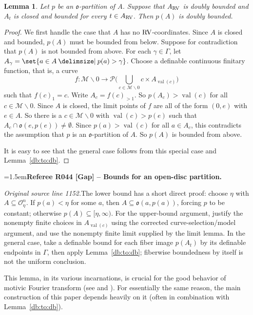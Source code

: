 \documentclass[12pt]{amsart}
\newcommand{\RefereeRemark}[4]{%
  \par\medskip\begingroup\normalfont\small\color{RefereePurple}%
  \emergencystretch=1.5em\noindent\textbf{Referee R#1 [#2] -- #3.}\par\nobreak\noindent #4\par
  \endgroup\medskip
}
\theoremstyle{plain}
\newtheorem{lem}[thm]{Lemma}
\theoremstyle{definition}
\theoremstyle{remark}
\numberwithin{equation}{section}
\theoremstyle{plain}
\newcommand{\RV}{\textup{RV}}
\newcommand{\MM}{\mdl M}
\newcommand{\OO}{\mdl O}
\newcommand{\go}{\mathfrak{o}}
\newcommand{\0}{\emptyset}
\newcommand{\mdl}[1]{\mathcal{#1}}  %
\newcommand{\fun}{\longrightarrow}
\newcommand{\mi}{\smallsetminus}
\providecommand\given{}
\newcommand\SetSymbol[1][]{%
\nonscript \: #1 \vert
\allowbreak
\nonscript\:
\mathopen{}}
\renewcommand\given{\SetSymbol[\delimsize]}
\DeclareMathOperator{\vv}{val}
\begin{document}
\begin{lem}\label{vol:par:bounded}
Let $p$ be an $\go$-partition of $A$. Suppose that $A_{\RV}$ is doubly bounded and $A_t$ is closed and bounded for every $t \in A_{\RV}$. Then $p(A)$ is doubly bounded.
\end{lem}
\begin{proof}
We first handle the case that $A$ has no $\RV$-coordinates. Since $A$ is closed and bounded, $p(A)$ must be bounded from below. Suppose for contradiction that $p(A)$ is not bounded from above. For each $\gamma \in \Gamma$, let $A_{\gamma} = \set{a \in A \given p(a) > \gamma }$. Choose a definable continuous finitary function, that is, a curve
\[
f : \MM \mi 0 \fun \mdl P \bigg( \bigcup_{c \in \MM \mi 0} c \times A_{\vv(c)} \bigg)
\]
such that $f(c)_1 = c$. Write $A_c = f(c)_{>1}$. So $p(A_c) > \vv(c)$ for all $c \in \MM \mi 0$. Since  $A$ is closed, the limit points of $f$ are all of the form $(0,e)$ with $e \in A$. So there is a $c \in \MM \mi 0$ with $\vv(c) > p( e)$ such that $A_c \cap \go(e, p( e)) \neq \0$. Since $p(a) > \vv(c)$ for all $a \in A_c$, this contradicts the assumption that $p$ is an $\go$-partition of $A$. So $p(A)$ is bounded from above.

It is easy to see that the general case follows from this special case and Lemma~\ref{db:to:db}.
\end{proof}

\RefereeRemark{044}{Gap}{Bounds for an open-disc partition}{%
\textit{Original source line 1152.}\quad The lower bound has a short direct proof: choose $\eta$ with $A\subseteq\OO_\eta^n$. If $p(a)<\eta$ for some $a$, then $A\subseteq\go(a,p(a))$, forcing $p$ to be constant; otherwise $p(A)\subseteq[\eta,\infty)$. For the upper-bound argument, justify the nonempty finite choices in $A_{\vv(c)}$ using the corrected curve-selection/model argument, and use the nonempty finite limit supplied by the limit lemma. In the general case, take a definable bound for each fiber image $p(A_t)$ by its definable endpoints in $\Gamma$, then apply Lemma~\ref{db:to:db}; fiberwise boundedness by itself is not the uniform conclusion.
}

This lemma, in its various incarnations, is crucial for the good behavior of motivic Fourier transform (see \cite[\S~11]{hrushovski:kazhdan:integration:vf} and \cite{yin:hk:part:3}). For essentially the same reason, the  main construction of this paper depends heavily on  it (often in combination with Lemma~\ref{db:to:db}).
\end{document}

